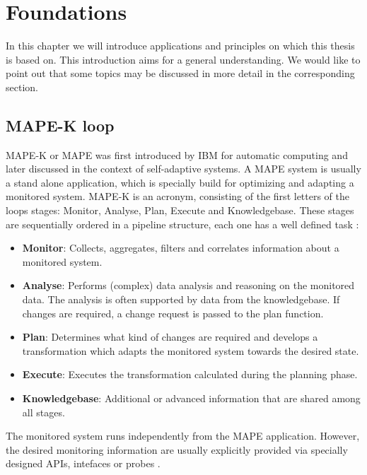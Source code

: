 \chapter{Foundations}
\label{ch:Foundations}

In this chapter we will introduce applications and principles on which this thesis is based on. This introduction aims for a general understanding. We would like to point out that some topics may be discussed in more detail in the corresponding section.

\section{MAPE-K loop}
\label{sec:Foundations:mape}

MAPE-K or MAPE was first introduced by IBM for automatic computing and later discussed in the context of self-adaptive systems. A MAPE system is usually a stand alone application, which is specially build for optimizing and adapting a monitored system. MAPE-K is an acronym, consisting of the first letters of the loops stages: Monitor, Analyse, Plan, Execute and Knowledgebase. These stages are sequentially ordered in a pipeline structure, each one has a well defined task \cite{Dar.2012}:

\begin{itemize}
	\setlength\itemsep{0em}
	\item \textbf{Monitor}: Collects, aggregates, filters and correlates information about a monitored system.
	\item \textbf{Analyse}: Performs (complex) data analysis and reasoning on the monitored data. The analysis is often supported by data from the knowledgebase. If changes are required, a change request is passed to the plan function.
	\item \textbf{Plan}: Determines what kind of changes are required and develops a transformation which adapts the monitored system towards the desired state.
	\item \textbf{Execute}: Executes the transformation calculated during the planning phase.
	\item \textbf{Knowledgebase}: Additional or advanced information that are shared among all stages.
\end{itemize}

The monitored system runs independently from the MAPE application. However, the desired monitoring information are usually explicitly provided via specially designed APIs, intefaces or probes \cite{Dar.2012}.


